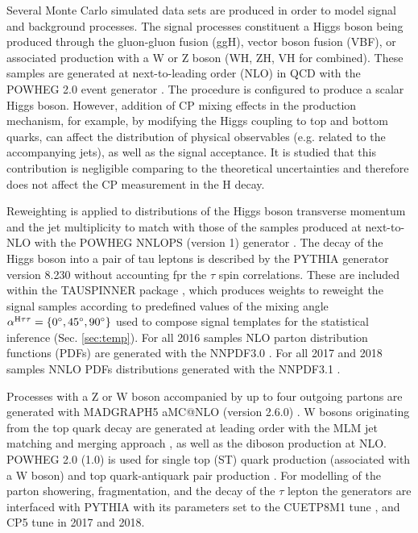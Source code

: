 Several Monte Carlo simulated data sets are produced in order to model signal and background processes. The signal processes constituent a Higgs boson being produced through the gluon-gluon fusion (ggH), vector boson fusion (VBF), or associated production with a W or Z boson (WH, ZH, VH for combined). These samples are generated at next-to-leading order (NLO) in QCD with the POWHEG 2.0 event generator \cite{Nason:2004rx,Frixione:2007vw,Alioli:2010xd,Bagnaschi:2011tu,Nason:2009ai,Jezo:2015aia,Granata:2017iod}. The procedure is configured to produce a scalar Higgs boson. However, addition of CP mixing effects in the production mechanism, for example, by modifying the Higgs coupling to top and bottom quarks, can affect the distribution of physical observables (e.g. related to the accompanying jets), as well as the signal acceptance. It is studied that this contribution is negligible comparing to the theoretical uncertainties and therefore does not affect the CP measurement in the H decay.

Reweighting is applied to distributions of the Higgs boson transverse momentum and the jet multiplicity to match with those of the samples produced at next-to-NLO with the POWHEG NNLOPS (version 1) generator \cite{Hamilton:2013fea,Hamilton:2015nsa}. The decay of the Higgs boson into a pair of tau leptons is described by the PYTHIA generator version 8.230 \cite{Sjostrand:2014zea} without accounting fpr the $\tau$ spin correlations. These are included within the TAUSPINNER package \cite{Przedzinski:2018ett}, which produces weights to reweight the signal samples according to predefined values of the mixing angle $\alpha^{\text{H}\tau\tau}=\{0^\circ, 45^\circ, 90^\circ\}$ used to compose signal templates for the statistical inference (Sec. \ref{sec:temp}). For all 2016 samples NLO parton distribution functions (PDFs) are generated with the NNPDF3.0 \cite{NNPDF:2014otw}. For all 2017 and 2018 samples NNLO PDFs distributions generated with the NNPDF3.1 \cite{NNPDF:2017mvq}.

Processes with a Z or W boson accompanied by up to four outgoing partons are generated with MADGRAPH5 aMC@NLO (version 2.6.0) \cite{Alwall:2014hca}. W bosons originating from the top quark decay are generated at leading order with the MLM jet matching and merging approach \cite{Alwall:2007fs}, as well as the diboson production at NLO. POWHEG 2.0 (1.0) is used for single top (ST) quark production (associated with a W boson) \cite{Re:2010bp,Frederix:2012dh} and top quark-antiquark pair production \cite{Alioli:2011as}. For modelling of the parton showering, fragmentation, and the decay of the $\tau$ lepton the generators are interfaced with PYTHIA with its parameters set to the CUETP8M1 tune \cite{CMS:2015wcf} , and CP5 tune \cite{CMS:2019csb} in 2017 and 2018. 

